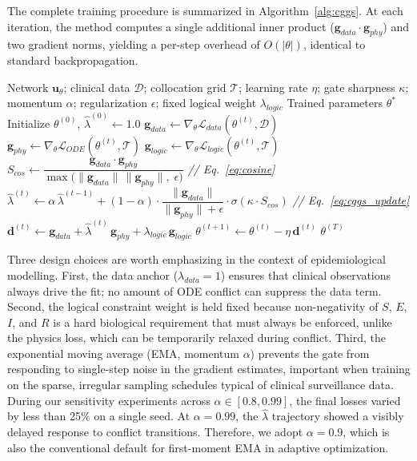 \documentclass[11pt]{article}
\begin{document}
The complete training procedure is summarized in Algorithm~\ref{alg:cggs}. At each iteration, the method computes a single additional inner product ($\mathbf{g}_{data} \cdot \mathbf{g}_{phy}$) and two gradient norms, yielding a per-step overhead of $O(|\theta|)$, identical to standard backpropagation.

\begin{algorithm}[H]
\caption{CGGS training for epidemiological PINNs}
\label{alg:cggs}
\begin{algorithmic}[1]
\REQUIRE Network $\mathbf{u}_\theta$; clinical data $\mathcal{D}$; collocation grid $\mathcal{T}$; learning rate $\eta$; gate sharpness $\kappa$; momentum $\alpha$; regularization $\epsilon$; fixed logical weight $\lambda_{logic}$
\ENSURE Trained parameters $\theta^{*}$
\STATE Initialize $\theta^{(0)}$, \; $\hat{\lambda}^{(0)} \gets 1.0$
  \STATE $\mathbf{g}_{data} \gets \nabla_\theta \mathcal{L}_{data}(\theta^{(t)}, \mathcal{D})$
  \STATE $\mathbf{g}_{phy} \gets \nabla_\theta \mathcal{L}_{ODE}(\theta^{(t)}, \mathcal{T})$
  \STATE $\mathbf{g}_{logic} \gets \nabla_\theta \mathcal{L}_{logic}(\theta^{(t)}, \mathcal{T})$
  \STATE $S_{cos} \gets \dfrac{\mathbf{g}_{data} \cdot \mathbf{g}_{phy}}{\max\!\bigl(\|\mathbf{g}_{data}\|\,\|\mathbf{g}_{phy}\|,\; \epsilon\bigr)}$ \hfill\textit{// Eq.~\eqref{eq:cosine}}
  \STATE $\hat{\lambda}^{(t)} \gets \alpha\,\hat{\lambda}^{(t-1)} + (1-\alpha) \cdot \dfrac{\|\mathbf{g}_{data}\|}{\|\mathbf{g}_{phy}\| + \epsilon} \cdot \sigma(\kappa \cdot S_{cos})$ \hfill\textit{// Eq.~\eqref{eq:cggs_update}}
  \STATE $\mathbf{d}^{(t)} \gets \mathbf{g}_{data} + \hat{\lambda}^{(t)}\, \mathbf{g}_{phy} + \lambda_{logic}\, \mathbf{g}_{logic}$
  \STATE $\theta^{(t+1)} \gets \theta^{(t)} - \eta\, \mathbf{d}^{(t)}$
\ENDFOR
\RETURN $\theta^{(T)}$
\end{algorithmic}
\end{algorithm}

Three design choices are worth emphasizing in the context of epidemiological modelling. First, the data anchor ($\lambda_{data} = 1$) ensures that clinical observations always drive the fit; no amount of ODE conflict can suppress the data term. Second, the logical constraint weight is held fixed because non-negativity of $S$, $E$, $I$, and $R$ is a hard biological requirement that must always be enforced, unlike the physics loss, which can be temporarily relaxed during conflict. Third, the exponential moving average (EMA, momentum $\alpha$) prevents the gate from responding to single-step noise in the gradient estimates, important when training on the sparse, irregular sampling schedules typical of clinical surveillance data. During our sensitivity experiments across $\alpha \in [0.8, 0.99]$, the final losses varied by less than 25\% on a single seed. At $\alpha = 0.99$, the $\hat{\lambda}$ trajectory showed a visibly delayed response to conflict transitions. Therefore, we adopt $\alpha = 0.9$, which is also the conventional default for first-moment EMA in adaptive optimization.
\end{document}
